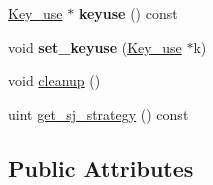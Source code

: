 \begin{DoxyCompactItemize}
\mbox{\label{classJOIN__TAB_a2fac391b8d9b551f2030417e45b3b180}} 
\mbox{\hyperlink{classKey__use}{Key\+\_\+use}} $\ast$ {\bfseries keyuse} () const
\item 
\mbox{\label{classJOIN__TAB_a2978b618468877fe23be450cc6af0a02}} 
void {\bfseries set\+\_\+keyuse} (\mbox{\hyperlink{classKey__use}{Key\+\_\+use}} $\ast$k)
\item 
void \mbox{\hyperlink{group__Query__Optimizer_gae913870950feb0d927de9b53963f0a6a}{cleanup}} ()
\item 
uint \mbox{\hyperlink{group__Query__Optimizer_gabc77304fe7c751bce4fa59ef52d91fb0}{get\+\_\+sj\+\_\+strategy}} () const
\end{DoxyCompactItemize}
\subsection*{Public Attributes}
